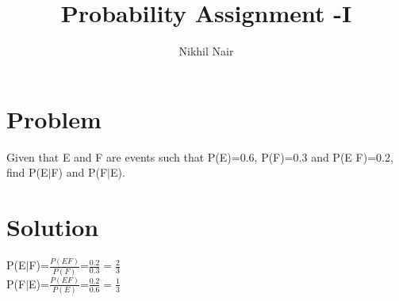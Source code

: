 \documentclass[journal,12pt,twocolumn]{IEEEtran}
\title{\mytitle}
\title{
Probability Assignment -I
}
\author{Nikhil Nair}
\begin{document}
\maketitle
\bigskip


\section{\textbf{Problem }}
Given that E and F are events such that P(E)=0.6, P(F)=0.3 and P(E F)=0.2, find P(E$\mid$F) and P(F$\mid$E).



\section{\textbf{Solution }}

P(E$\mid$F)=$\frac{P(E  F)}{P(F)}$=$\frac{0.2}{0.3}=\frac{2}{3}$
\\

P(F$\mid$E)=$\frac{P(E  F)}{P(E)}$=$\frac{0.2}{0.6}=\frac{1}{3}$
\end{document}
